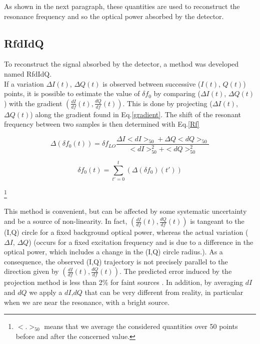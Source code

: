 
As shown in the next paragraph, these quantities are used to reconstruct the resonance frequency and so the optical power absorbed by the detector.

\subsection{RfdIdQ}
To reconstruct the signal absorbed by the detector, a method was developed named RfdIdQ.\\
If a variation $\Delta I(t)$, $\Delta Q(t)$ is observed between successive  ($I(t)$, $Q(t)$) points, it is possible to estimate the value of $\delta f_{0}$ by comparing ($\Delta I(t)$, $\Delta Q(t)$) with the gradient $(\frac{dI}{df}(t),\frac{dQ}{df}(t)) $. This is done by projecting ($\Delta I(t)$, $\Delta Q(t)$) along the gradient found in Eq.\ref{gradient}. The shift of the resonant frequency between two samples is then determined with Eq.\ref{Rf} \citep{2014A&A...569A...9C}

\begin{equation}
\label{Rf}
\Delta (\delta f_{0}(t)) = \delta f_{LO} \frac{\Delta I<dI>_{50} + \Delta Q<dQ>_{50} }{<dI>_{50}^{2} + <dQ>_{50}^{2}}
\end{equation}

\begin{equation}
\delta f_{0}(t) = \sum^{t}_{t'=0} (\Delta (\delta f_{0})(t'))
\end{equation}

\footnote{$<.>_{50}$ means that we average the considered quantities over 50 points before and after the concerned value.}

This method is convenient, but can be affected by some systematic uncertainty and be a source of non-linearity. In fact, $(\frac{dI}{df}(t),\frac{dQ}{df}(t))$ is tangeant to the (I,Q) circle for a fixed background optical power, whereas the actual variation ($\Delta I$, $\Delta Q$) (occurs for a fixed excitation frequency and is due to a difference in the optical power, which includes a change in the (I,Q) circle radius.). As a consequence, the observed (I,Q) trajectory is not precisely parallel to the direction given by $(\frac{dI}{df}(t),\frac{dQ}{df}(t))$. The predicted error induced by the projection method is less than 2\% for faint sources \citep{2013A&A...551L..12C}. In addition, by averaging $dI$ and $dQ$ we apply a $dI$,$dQ$ that can be very different from reality, in particular when we are near the resonance, with a bright source.\\

